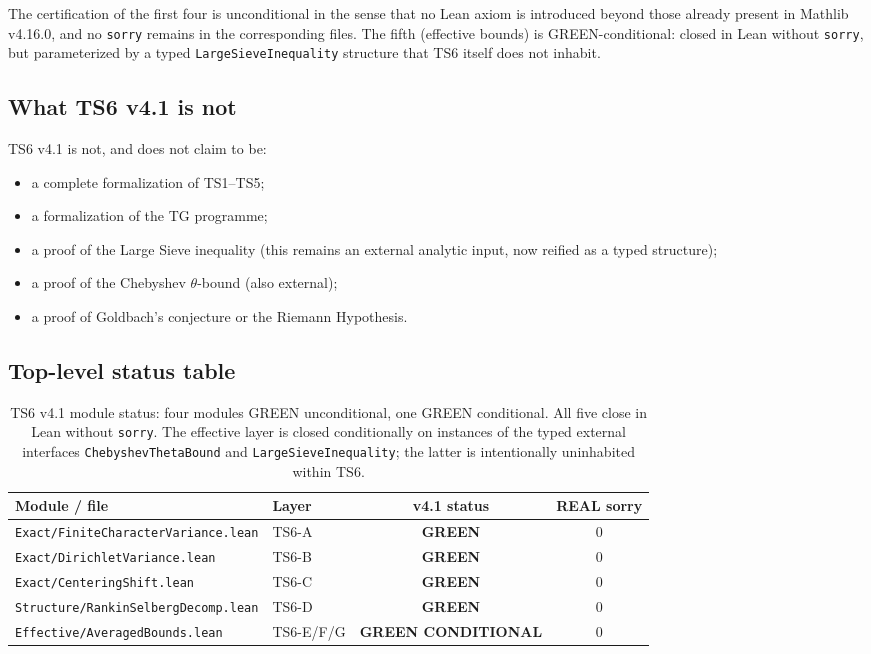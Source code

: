 \documentclass[11pt,a4paper]{article}
\theoremstyle{definition}
\newcommand{\GREEN}{\textcolor{green!50!black}{\textbf{GREEN}}}
\newcommand{\GREENC}{\textcolor{green!50!black}{\textbf{GREEN CONDITIONAL}}}
\begin{document}
The certification of the first four is unconditional in the sense that no Lean axiom is introduced beyond those already present in Mathlib v4.16.0, and no \texttt{sorry} remains in the corresponding files. The fifth (effective bounds) is GREEN-conditional: closed in Lean without \texttt{sorry}, but parameterized by a typed \verb|LargeSieveInequality| structure that TS6 itself does not inhabit.

\subsection{What TS6 v4.1 is not}

TS6 v4.1 is not, and does not claim to be:
\begin{itemize}[noitemsep]
\item a complete formalization of TS1--TS5;
\item a formalization of the TG programme;
\item a proof of the Large Sieve inequality (this remains an external analytic input, now reified as a typed structure);
\item a proof of the Chebyshev $\theta$-bound (also external);
\item a proof of Goldbach's conjecture or the Riemann Hypothesis.
\end{itemize}

\subsection{Top-level status table}

\begin{table}[h]
\centering
\renewcommand{\arraystretch}{1.25}
\begin{tabular}{@{}llcc@{}}
\toprule
\textbf{Module / file} & \textbf{Layer} & \textbf{v4.1 status} & \textbf{REAL sorry} \\
\midrule
\verb|Exact/FiniteCharacterVariance.lean| & TS6-A & \GREEN & 0 \\
\verb|Exact/DirichletVariance.lean| & TS6-B & \GREEN & 0 \\
\verb|Exact/CenteringShift.lean| & TS6-C & \GREEN & 0 \\
\verb|Structure/RankinSelbergDecomp.lean| & TS6-D & \GREEN & 0 \\
\verb|Effective/AveragedBounds.lean| & TS6-E/F/G & \GREENC & 0 \\
\bottomrule
\end{tabular}
\caption{TS6 v4.1 module status: four modules GREEN unconditional, one GREEN conditional. All five close in Lean without \texttt{sorry}. The effective layer is closed conditionally on instances of the typed external interfaces \texttt{ChebyshevThetaBound} and \texttt{LargeSieveInequality}; the latter is intentionally uninhabited within TS6.}\label{tab:status-v41}
\end{table}
\end{document}
